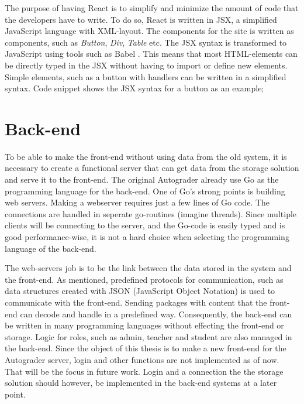 The purpose of having React is to simplify and minimize the amount of code that the developers have to write. To do so, React is written in JSX, a simplified JavaScript language with XML-layout. The components for the site is written as components, such as \emph{Button}, \emph{Div}, \emph{Table} etc. The JSX syntax is transformed to JavaScript using tools such as Babel . This means that most HTML-elements can be directly typed in the JSX without having to import or define new elements. Simple elements, such as a button with handlers can be written in a simplified syntax. Code snippet  shows the JSX syntax for a button as an example;



\section{Back-end}
To be able to make the front-end without using data from the old system, it is necessary to create a functional server that can get data from the storage solution and serve it to the front-end. The original Autograder already use Go as the programming language for the back-end. One of Go's strong points is building web servers. Making a webserver requires just a few lines of Go code. The connections are handled in seperate go-routines (imagine threads). Since multiple clients will be connecting to the server, and the Go-code is easily typed and is good performance-wise, it is not a hard choice when selecting the programming language of the back-end. 

The web-servers job is to be the link between the data stored in the system and the front-end. As mentioned, predefined protocols for communication, such as data structures created with JSON (JavaScript Object Notation) is used to communicate with the front-end. Sending packages with content that the front-end can decode and handle in a predefined way. Consequently, the back-end can be written in many programming languages without effecting the front-end or storage. Logic for roles, such as admin, teacher and student are also managed in the back-end. Since the object of this thesis is to make a new front-end for the Autograder server, login and other functions are not implemented as of now. That will be the focus in future work. Login and a connection the the storage solution should however, be implemented in the back-end systems at a later point. 

